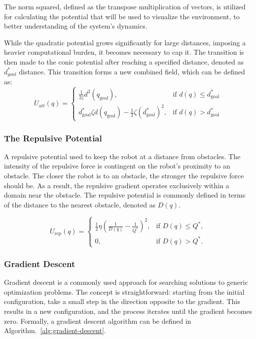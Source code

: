 \documentclass{IEEEtaes}
\begin{document}
{The norm squared, defined as the transpose multiplication of vectors, is utilized for calculating the potential that will be used to visualize the environment, to better understanding of the system's dynamics.

While the quadratic potential grows significantly for large distances, imposing a heavier computational burden, it becomes necessary to cap it. The transition is then made to the conic potential after reaching a specified distance, denoted as $d^*_{goal}$ distance. This transition forms a new combined field, which can be defined as:
\begin{equation*}
U_{att}(q)=
\begin{cases}
        \frac{1}{2\zeta} d^2(q_{\text{goal}}),  &\text{if } d(q) \leq d^*_{\text{goal}} \\
        d^*_{\text{goal}} \zeta d(q_{\text{goal}}) - \frac{1}{2}\zeta \left(d^*_{\text{goal}}\right)^2,  &\text{if } d(q) > d^*_{\text{goal}}
\end{cases}
\end{equation*}


\subsubsection{The Repulsive Potential}

A repulsive potential used to keep the robot at a distance from obstacles. The intensity of the repulsive force is contingent on the robot's proximity to an obstacle. The closer the robot is to an obstacle, the stronger the repulsive force should be. As a result, the repulsive gradient operates exclusively within a domain near the obstacle. The repulsive potential is commonly defined in terms of the distance to the nearest obstacle, denoted as $D(q)$.

\begin{equation*}
    U_{\text{rep}}(q) =
    \begin{cases}
        \frac{1}{2}\eta (\frac{1}{D(q)} - \frac{1}{Q^*})^2, & \text{if } D(q) \leq Q^*, \\
        0, & \text{if } D(q) > Q^*.
    \end{cases}
\end{equation*}


\subsubsection{Gradient Descent}
Gradient descent is a commonly used approach for searching solutions to generic optimization problems. The concept is straightforward: starting from the initial configuration, take a small step in the direction opposite to the gradient. This results in a new configuration, and the process iterates until the gradient becomes zero. Formally, a gradient descent algorithm can be defined in Algorithm.~\ref{alg:gradient-descent}.


}
\end{document}
